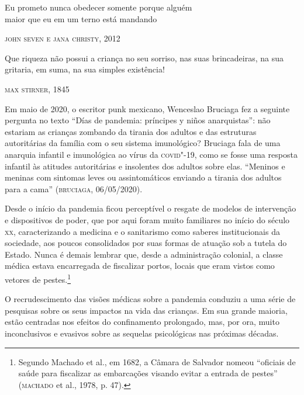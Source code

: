 
\epigraph{Eu prometo nunca obedecer somente porque alguém\\
maior que eu em um terno está mandando}{\textsc{john seven e jana christy}, 2012}

\epigraph{Que riqueza não possui a criança no seu sorriso, nas suas
brincadeiras, na sua gritaria, em suma, na sua simples existência!}{\textsc{max stirner}, 1845}

\noindent{}Em maio de 2020, o escritor punk mexicano, Wenceslao Bruciaga fez a
seguinte pergunta no texto ``Días de pandemia: príncipes y niños
anarquistas'': não estariam as crianças zombando da tirania dos adultos
e das estruturas autoritárias da família com o seu sistema imunológico?
Bruciaga fala de uma anarquia infantil e imunológica ao vírus da
\textsc{covid}"-19, como se fosse uma resposta infantil às atitudes autoritárias e
insolentes dos adultos sobre elas. ``Meninos e meninas com sintomas
leves ou assintomáticos enviando a tirania dos adultos para a cama''
(\textsc{bruciaga}, 06/05/2020).

Desde o início da pandemia ficou perceptível o resgate de modelos de
intervenção e dispositivos de poder, que por aqui foram muito familiares
no início do século \textsc{xx}, caracterizando a medicina e o sanitarismo como
saberes institucionais da sociedade, aos poucos consolidados por suas
formas de atuação sob a tutela do Estado. Nunca é demais lembrar que,
desde a administração colonial, a classe médica estava encarregada de
fiscalizar portos, locais que eram vistos como vetores de
pestes.\footnote{Segundo Machado et al., em 1682, a Câmara de Salvador
  nomeou ``oficiais de saúde para fiscalizar as embarcações visando
  evitar a entrada de pestes'' (\textsc{machado} et al., 1978, p. 47).}

O recrudescimento das visões médicas sobre a pandemia conduziu a uma
série de pesquisas sobre os seus impactos na vida das crianças. Em sua
grande maioria, estão centradas nos efeitos do confinamento prolongado,
mas, por ora, muito inconclusivos e evasivos sobre as sequelas
psicológicas nas próximas décadas.

